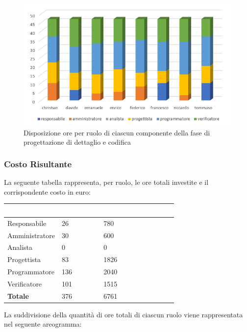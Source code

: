 \begin{figure}[h!]
\centering
\caption{Disposizione ore per ruolo di ciascun componente della fase di progettazione di dettaglio e codifica}
\includegraphics[scale=2.5]{sezioni/Istogrammi/IstogrammaDiDettaglio.png}
\end{figure}

\subsubsection{Costo Risultante}
La seguente tabella rappresenta, per ruolo, le ore totali investite e il corrispondente costo in euro:
{
\renewcommand{\arraystretch}{2}
\begin{table}[h]
\centering
\caption{Tabella del costo risultante della Programmazione di Dettaglio e Codifica}
\begin{longtable}{ C{3cm} C{2cm} C{4cm}}
	\textcolor{white}{\textbf{Ruolo}} & 
	\textcolor{white}{\textbf{Totale ore}} & 
	\textcolor{white}{\textbf{Costo ruolo in euro}}\\	
\endhead
        
        Responsabile & 26 & 780 \\
        Amministratore & 30 & 600 \\
        Analista & 0 & 0 \\
        Progettista & 83 & 1826 \\
        Programmatore & 136 & 2040 \\
        Verificatore & 101 & 1515\\
        \textbf{Totale} & 376 & 6761 \\
		
	\end{longtable}
\end{table}
}
\newline
La suddivisione della quantità di ore totali di ciascun ruolo viene rappresentata nel seguente areogramma:

